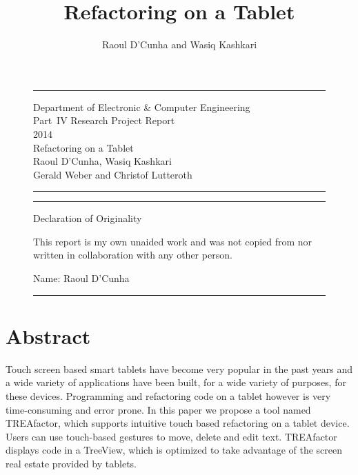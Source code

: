 \documentclass[10.5pt,twocolumn]{article}
\begin{document}
\begin{figure}[!t]
\centering
\hrule
\vspace{1em}
Department of Electronic \& Computer Engineering \\
Part~{\scshape IV} Research Project Report \\
2014 \\
Refactoring on a Tablet \\
Raoul D'Cunha, Wasiq Kashkari \\
Gerald Weber and Christof Lutteroth
\vspace{1em}
\hrule
\end{figure}

\clearpage

\begin{figure}[!t]
\centering
\hrule
\vspace{1em}
Declaration of Originality

This report is my own unaided work and was not copied from nor written in
collaboration with any other person.

\vspace{1em}

Name: Raoul D'Cunha
\vspace{1em}
\hrule
\end{figure}

\clearpage

\title{Refactoring on a Tablet}
\author{Raoul D'Cunha and Wasiq Kashkari \\
  }
\date{\vspace{-2ex}}
\maketitle

\section{Abstract}
Touch screen based smart tablets have become very popular in the past years and a wide variety of applications have been built, for a wide variety of purposes, for these devices. Programming and refactoring code on a tablet however is very time-consuming and error prone. In this paper we propose a tool named TREAfactor, which supports intuitive touch based refactoring on a tablet device. Users can use touch-based gestures to move, delete and edit text. TREAfactor displays code in a TreeView, which is optimized to take advantage of the screen real estate provided by tablets. 
\end{document}
